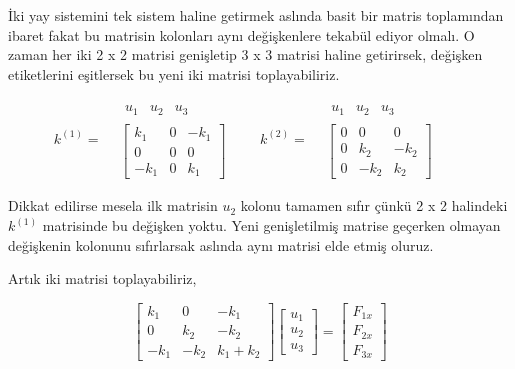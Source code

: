 \documentclass[12pt,fleqn]{article}\usepackage{../../common}
\begin{document}
İki yay sistemini tek sistem haline getirmek aslında basit bir matris
toplamından ibaret fakat bu matrisin kolonları aynı değişkenlere tekabül ediyor
olmalı. O zaman her iki 2 x 2 matrisi genişletip 3 x 3 matrisi haline
getirirsek, değişken etiketlerini eşitlersek bu yeni iki matrisi
toplayabiliriz.

$$
k^{(1)} =
\begin{array}{cc} & \begin{array}{ccc} u_1 & u_2 & u_3 \end{array} \\ &
\left[
\begin{array}{ccc}
k_1 & 0 & -k_1 \\
0 & 0 & 0 \\
-k_1 & 0 & k_1
\end{array}
\right]
\end{array} \qquad
k^{(2)} =
\begin{array}{cc} & \begin{array}{ccc} u_1 & u_2 & u_3 \end{array} \\ &
\left[
\begin{array}{ccc}
0 & 0 & 0 \\
0 & k_2 & -k_2 \\
0 & -k_2 & k_2
\end{array}
\right]
\end{array} \qquad
$$

Dikkat edilirse mesela ilk matrisin $u_2$ kolonu tamamen sıfır çünkü 2 x 2
halindeki $k^{(1)}$ matrisinde bu değişken yoktu. Yeni genişletilmiş matrise
geçerken olmayan değişkenin kolonunu sıfırlarsak aslında aynı matrisi elde etmiş
oluruz.

Artık iki matrisi toplayabiliriz,

$$
\left[\begin{array}{ccc}
k_1 & 0 & -k_1 \\
0 & k_2 & -k_2 \\
-k_1 & -k_2 & k_1+k_2
\end{array}\right]
\left[\begin{array}{c}
u_1 \\ u_2 \\ u_3
\end{array}\right] =
\left[\begin{array}{c}
F_{1x} \\ F_{2x} \\ F_{3x}
\end{array}\right]
$$
\end{document}
